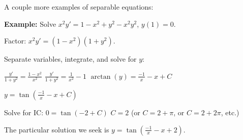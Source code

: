 \documentclass[10pt,aspectratio=169]{beamer}
\begin{document}
\begin{frame}
A couple more examples of separable equations:

\medskip
\pause

\textbf{Example:}
Solve \quad $x^2y' = 1 - x^2+y^2 - x^2y^2$, \quad $y(1) = 0$.

\medskip
\pause

Factor:
\quad
$\displaystyle
x^2y' = (1 - x^2)(1+y^2)$.

\medskip
\pause

Separate variables, integrate, and solve for $y$:

\medskip
\pause

\quad
$\displaystyle
\frac{y'}{1+y^2} = \frac{1 - x^2}{x^2}$
\pause
\wthus
$\displaystyle
\frac{y'}{1+y^2} = \frac{1}{x^2} - 1$
\pause
\wthus
$\displaystyle
\operatorname{arctan} (y) = \frac{-1}{x} - x + C$

\medskip
\pause

\wthus
\quad
$\displaystyle
y = \tan \left(\frac{-1}{x} - x + C\right)$

\medskip
\pause

Solve for IC:
\quad
$0 = \tan(-2+C)$
\pause
\wthus
$C=2$ \pause \quad (or $C = 2 + \pi$, or $C = 2 + 2\pi$, etc.)

\medskip
\pause

The particular solution we seek is
\quad
$\displaystyle
y = \tan \left(\frac{-1}{x} - x + 2 \right)$.

\end{frame}
\end{document}
